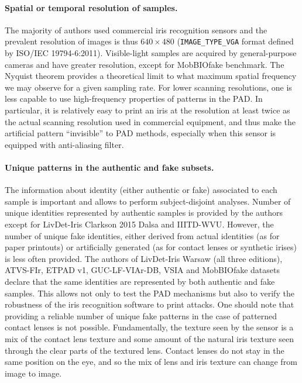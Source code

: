\documentclass[format=acmsmall, review=false, timestamp=false]{acmart}
\begin{document}
\paragraph{Spatial or temporal resolution of samples.} The majority of authors used commercial iris recognition sensors and the prevalent resolution of images is thus $640 \times 480$ (\verb+IMAGE_TYPE_VGA+ format defined by ISO/IEC 19794-6:2011). Visible-light samples are acquired by general-purpose cameras and have greater resolution, except for {\sf MobBIOfake} benchmark. The Nyquist theorem provides a theoretical limit to what maximum spatial frequency we may observe for a given sampling rate. For lower scanning resolutions, one is less capable to use high-frequency properties of patterns in the PAD. In particular, it is relatively easy to print an iris at the resolution at least twice as the actual scanning resolution used in commercial equipment, and thus make the artificial pattern ``invisible'' to PAD methods, especially when this sensor is equipped with anti-aliasing filter.

\paragraph{Unique patterns in the authentic and fake subsets.} The information about identity (either authentic or fake) associated to each sample is important and allows to perform subject-disjoint {analyses}. Number of unique identities {represented} by authentic samples is provided by the authors except for {\sf LivDet-Iris Clarkson 2015 Dalsa} and {{\sf IIITD-WVU}.} However, the number of unique fake identities, either derived from actual identities (as for paper printouts) or artificially generated (as for contact lenses or synthetic irises) is less often provided. The authors of {\sf LivDet-Iris Warsaw} (all three editions), {\sf ATVS-FIr}, {\sf ETPAD v1}, {\sf GUC-LF-VIAr-DB}, {\sf VSIA} {and {\sf MobBIOfake}} datasets declare that the same identities are represented by both authentic and {fake} samples. This allows not only to test the PAD mechanisms but also to verify the robustness of the iris recognition software to print attacks. {One should note that providing a reliable number of unique fake patterns in the case of patterned contact lenses is not possible. Fundamentally, the texture seen by the sensor is a mix of the contact lens texture and some amount of the natural iris texture seen through the clear parts of the textured lens. Contact lenses do not stay in the same position on the eye, and so the mix of lens and iris texture can change from image to image.}
\end{document}
